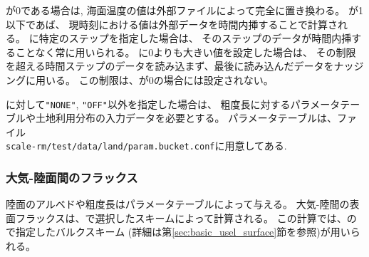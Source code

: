 が0である場合は,
海面温度の値は外部ファイルによって完全に置き換わる。
が1以下であば、
現時刻における値は外部データを時間内挿することで計算される。
に特定のステップを指定した場合は、
そのステップのデータが時間内挿することなく常に用いられる。
に0よりも大きい値を設定した場合は、
その制限を超える時間ステップのデータを読み込まず、最後に読み込んだデータをナッジングに用いる。
この制限は、が0の場合には設定されない。

に対して\verb|"NONE"|, \verb|"OFF"|以外を指定した場合は、
粗度長に対するパラメータテーブルや土地利用分布の入力データを必要とする。
パラメータテーブルは、ファイル\\
\verb|scale-rm/test/data/land/param.bucket.conf|に用意してある.\\


\subsubsection{大気-陸面間のフラックス}
陸面のアルベドや粗度長はパラメータテーブルによって与える。
大気-陸間の表面フラックスは、で選択したスキームによって計算される。
この計算では、ので指定したバルクスキーム
(詳細は第\ref{sec:basic_usel_surface}節を参照)が用いられる。


